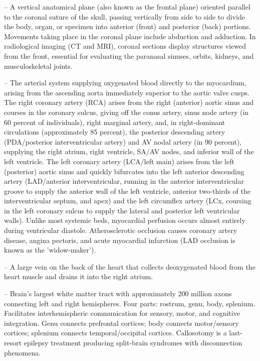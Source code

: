 -- A vertical anatomical plane (also known as the frontal plane) oriented parallel to the coronal suture of the skull, passing vertically from side to side to divide the body, organ, or specimen into anterior (front) and posterior (back) portions. Movements taking place in the coronal plane include abduction and adduction. In radiological imaging (CT and MRI), coronal sections display structures viewed from the front, essential for evaluating the paranasal sinuses, orbits, kidneys, and musculoskeletal joints.

-- The arterial system supplying oxygenated blood directly to the myocardium, arising from the ascending aorta immediately superior to the aortic valve cusps. The right coronary artery (RCA) arises from the right (anterior) aortic sinus and courses in the coronary sulcus, giving off the conus artery, sinus node artery (in 60 percent of individuals), right marginal artery, and, in right-dominant circulations (approximately 85 percent), the posterior descending artery (PDA/posterior interventricular artery) and AV nodal artery (in 90 percent), supplying the right atrium, right ventricle, SA/AV nodes, and inferior wall of the left ventricle. The left coronary artery (LCA/left main) arises from the left (posterior) aortic sinus and quickly bifurcates into the left anterior descending artery (LAD/anterior interventricular, running in the anterior interventricular groove to supply the anterior wall of the left ventricle, anterior two-thirds of the interventricular septum, and apex) and the left circumflex artery (LCx, coursing in the left coronary sulcus to supply the lateral and posterior left ventricular walls). Unlike most systemic beds, myocardial perfusion occurs almost entirely during ventricular diastole. Atherosclerotic occlusion causes coronary artery disease, angina pectoris, and acute myocardial infarction (LAD occlusion is known as the 'widow-maker').

-- A large vein on the back of the heart that collects deoxygenated blood from the heart muscle and drains it into the right atrium.

-- Brain's largest white matter tract with approximately 200 million axons connecting left and right hemispheres. Four parts: rostrum, genu, body, splenium. Facilitates interhemispheric communication for sensory, motor, and cognitive integration. Genu connects prefrontal cortices; body connects motor/sensory cortices; splenium connects temporal/occipital cortices. Callosotomy is a last-resort epilepsy treatment producing split-brain syndromes with disconnection phenomena.

